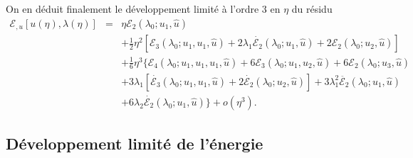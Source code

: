 \documentclass[12pt, final]{amsart}
\begin{document}
On en déduit finalement le développement limité à l'ordre 3 en
$\eta$ du résidu
\begin{eqnarray}
  \mathcal{E}_{, u} [u (\eta), \lambda (\eta)] & = & \eta \mathcal{E}_2
  (\lambda_0 ; u_1, \hat{u}) \nonumber\\
  &  &  + \tfrac{1}{2} \eta^2  [\mathcal{E}_3 (\lambda_0 ; u_1, u_1,
  \hat{u}) + 2 \lambda_1  \dot{\mathcal{E}_2} (\lambda_0 ; u_1, \hat{u}) +
  2\mathcal{E}_2 (\lambda_0 ; u_2, \hat{u})] \nonumber\\
  &  &  + \tfrac{1}{6} \eta^3  \{ \mathcal{E}_4 (\lambda_0 ; u_1,
  u_1, u_1, \hat{u}) + 6\mathcal{E}_3 (\lambda_0 ; u_1, u_2, \hat{u})
   + 6\mathcal{E}_2 (\lambda_0 ; u_3, \hat{u}) \nonumber\\
  &  &  + 3 \lambda_1  [\dot{\mathcal{E}_3} (\lambda_0 ; u_1, u_1,
  \hat{u}) + 2 \dot{\mathcal{E}_2} (\lambda_0 ; u_2, \hat{u})] + 3 \lambda_1^2
  \ddot{\mathcal{E}_2} (\lambda_0 ; u_1, \hat{u}) \nonumber\\
  &  &   + 6 \lambda_2  \dot{\mathcal{E}_2} (\lambda_0 ;
  u_1, \hat{u}) \} + o (\eta^3) .  \label{eq20220107080901}
\end{eqnarray}
\subsection{Développement limité de
l'énergie}\label{sec20220121172919}
\end{document}

